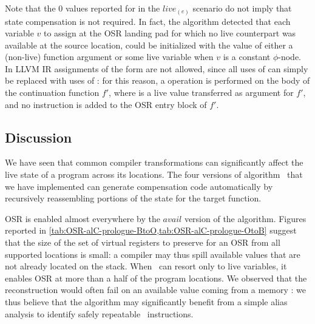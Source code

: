 Note that the $0$ values reported for  in the $live_{(e)}$ scenario do not imply that state compensation is not required. In fact, the algorithm detected that each variable $v$ to assign at the OSR landing pad for which no live counterpart was available at the source location, could be initialized with the value of either a (non-live) function argument or some live variable when $v$ is a constant $\phi$-node. In LLVM IR assignments of the form  are not allowed, since all uses of  can simply be replaced with uses of : for this reason, a  operation is performed on the body of the continuation function $f'$, where  is a live value transferred as argument for $f'$, and no instruction is added to the OSR entry block of $f'$.

\subsection{Discussion}
We have seen that common compiler transformations can significantly affect the live state of a program across its locations. The four versions of algorithm \reconstruct\ that we have implemented can generate compensation code automatically by recursively reassembling portions of the state for the target function.

OSR is enabled almost everywhere by the $avail$ version of the algorithm. Figures reported in \mytable\ref{tab:OSR-alC-prologue-BtoO,tab:OSR-alC-prologue-OtoB} suggest that the size of the set of virtual registers to preserve for an OSR from all supported locations is small: a compiler may thus spill available values that are not already located on the stack. When \reconstruct\ can resort only to live variables, it enables OSR at more than a half of the program locations. We observed that the reconstruction would often fail on an available value coming from a memory \load: we thus believe that the algorithm may significantly benefit from a simple alias analysis to identify safely repeatable \load\ instructions.

